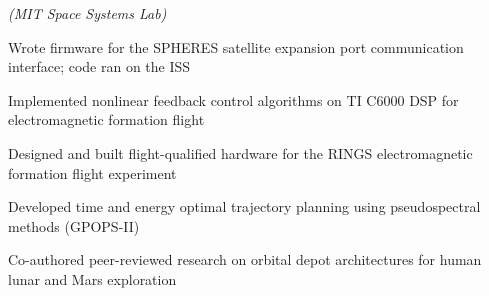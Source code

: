  \emph{(MIT Space Systems Lab)}
\begin{subenum}
\item Wrote firmware for the SPHERES satellite expansion port communication
  interface; code ran on the ISS
\item Implemented nonlinear feedback control algorithms on TI C6000 DSP for
  electromagnetic formation flight
\item Designed and built flight-qualified hardware for the RINGS electromagnetic
  formation flight experiment
\item Developed time and energy optimal trajectory planning using pseudospectral
  methods (GPOPS-II)
\item Co-authored peer-reviewed research on orbital depot architectures for human
  lunar and Mars exploration
\end{subenum}
